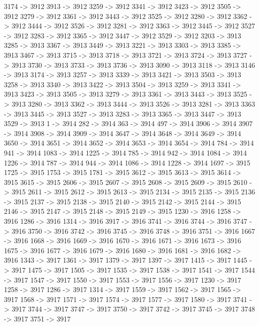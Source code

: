 {	3174 -> 3912
	3913 -> 3912
	3259 -> 3912
	3341 -> 3912
	3423 -> 3912
	3505 -> 3912
	3279 -> 3912
	3361 -> 3912
	3443 -> 3912
	3525 -> 3912
	3280 -> 3912
	3362 -> 3912
	3444 -> 3912
	3526 -> 3912
	3281 -> 3912
	3363 -> 3912
	3445 -> 3912
	3527 -> 3912
	3283 -> 3912
	3365 -> 3912
	3447 -> 3912
	3529 -> 3912
	3203 -> 3913
	3285 -> 3913
	3367 -> 3913
	3449 -> 3913
	3221 -> 3913
	3303 -> 3913
	3385 -> 3913
	3467 -> 3913
	3715 -> 3913
	3718 -> 3913
	3721 -> 3913
	3724 -> 3913
	3727 -> 3913
	3730 -> 3913
	3733 -> 3913
	3736 -> 3913
	3090 -> 3913
	3118 -> 3913
	3146 -> 3913
	3174 -> 3913
	3257 -> 3913
	3339 -> 3913
	3421 -> 3913
	3503 -> 3913
	3258 -> 3913
	3340 -> 3913
	3422 -> 3913
	3504 -> 3913
	3259 -> 3913
	3341 -> 3913
	3423 -> 3913
	3505 -> 3913
	3279 -> 3913
	3361 -> 3913
	3443 -> 3913
	3525 -> 3913
	3280 -> 3913
	3362 -> 3913
	3444 -> 3913
	3526 -> 3913
	3281 -> 3913
	3363 -> 3913
	3445 -> 3913
	3527 -> 3913
	3283 -> 3913
	3365 -> 3913
	3447 -> 3913
	3529 -> 3913
	1 -> 3914
	282 -> 3914
	363 -> 3914
	497 -> 3914
	3906 -> 3914
	3907 -> 3914
	3908 -> 3914
	3909 -> 3914
	3647 -> 3914
	3648 -> 3914
	3649 -> 3914
	3650 -> 3914
	3651 -> 3914
	3652 -> 3914
	3653 -> 3914
	3654 -> 3914
	784 -> 3914
	941 -> 3914
	1083 -> 3914
	1225 -> 3914
	785 -> 3914
	942 -> 3914
	1084 -> 3914
	1226 -> 3914
	787 -> 3914
	944 -> 3914
	1086 -> 3914
	1228 -> 3914
	1697 -> 3915
	1725 -> 3915
	1753 -> 3915
	1781 -> 3915
	3612 -> 3915
	3613 -> 3915
	3614 -> 3915
	3615 -> 3915
	2606 -> 3915
	2607 -> 3915
	2608 -> 3915
	2609 -> 3915
	2610 -> 3915
	2611 -> 3915
	2612 -> 3915
	2613 -> 3915
	2134 -> 3915
	2135 -> 3915
	2136 -> 3915
	2137 -> 3915
	2138 -> 3915
	2140 -> 3915
	2142 -> 3915
	2144 -> 3915
	2146 -> 3915
	2147 -> 3915
	2148 -> 3915
	2149 -> 3915
	1230 -> 3916
	1258 -> 3916
	1286 -> 3916
	1314 -> 3916
	3917 -> 3916
	3741 -> 3916
	3744 -> 3916
	3747 -> 3916
	3750 -> 3916
	3742 -> 3916
	3745 -> 3916
	3748 -> 3916
	3751 -> 3916
	1667 -> 3916
	1668 -> 3916
	1669 -> 3916
	1670 -> 3916
	1671 -> 3916
	1673 -> 3916
	1675 -> 3916
	1677 -> 3916
	1679 -> 3916
	1680 -> 3916
	1681 -> 3916
	1682 -> 3916
	1343 -> 3917
	1361 -> 3917
	1379 -> 3917
	1397 -> 3917
	1415 -> 3917
	1445 -> 3917
	1475 -> 3917
	1505 -> 3917
	1535 -> 3917
	1538 -> 3917
	1541 -> 3917
	1544 -> 3917
	1547 -> 3917
	1550 -> 3917
	1553 -> 3917
	1556 -> 3917
	1230 -> 3917
	1258 -> 3917
	1286 -> 3917
	1314 -> 3917
	1559 -> 3917
	1562 -> 3917
	1565 -> 3917
	1568 -> 3917
	1571 -> 3917
	1574 -> 3917
	1577 -> 3917
	1580 -> 3917
	3741 -> 3917
	3744 -> 3917
	3747 -> 3917
	3750 -> 3917
	3742 -> 3917
	3745 -> 3917
	3748 -> 3917
	3751 -> 3917
}
